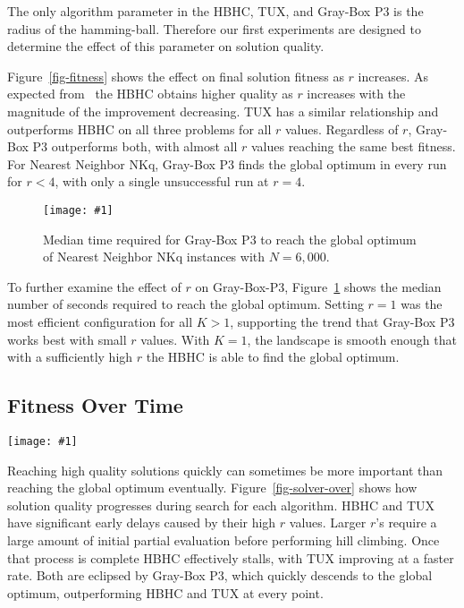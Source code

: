 \documentclass{sig-alternate}
\newcommand{\includegraphicsfit}[1]
{\texttt{[image: \#1]}}
\newcommand{\includegraphicswide}[1]
{\texttt{[image: \#1]}}
\begin{document}
The only algorithm parameter in the HBHC, TUX, and Gray-Box P3
is the radius of the hamming-ball. Therefore our first experiments are designed to determine
the effect of this parameter on solution quality.

Figure~\ref{fig-fitness} shows the effect on final solution fitness as $r$ increases. As expected
from~\cite{chicano:2014:ball} the HBHC obtains higher quality as $r$ increases with the magnitude
of the improvement decreasing. TUX has a similar relationship and
outperforms HBHC on all three problems for all $r$ values. Regardless of $r$, Gray-Box P3 outperforms both, with almost
all $r$ values reaching the same best fitness. For Nearest Neighbor NKq, Gray-Box P3 finds the global
optimum in every run for $r < 4$, with only a single unsuccessful run at $r=4$.

\begin{figure}
  \centering
  \includegraphicsfit{p3-seconds}
  \caption{Median time required for Gray-Box P3 to reach the global optimum of Nearest Neighbor NKq instances with $N=6,000$.}
  \label{fig-p3-seconds}
\end{figure}

To further examine the effect of $r$ on Gray-Box-P3, Figure~\ref{fig-p3-seconds} shows the median number of
seconds required to reach the global optimum. Setting $r=1$ was the most efficient configuration for all $K > 1$,
supporting the trend that Gray-Box P3 works best with small $r$ values. With $K=1$, the landscape is smooth enough
that with a sufficiently high $r$ the HBHC is able to find the global optimum.

\subsection{Fitness Over Time}

\begin{figure*}
  \centering
  \includegraphicswide{solver-over}
  \caption{Comparison of solution quality during optimization on a log-log scale for different algorithms. For NKq-Landscapes $N=6,000$ and $K=4$ and
  for Ising Spin Glasses $N=6,084$. Each algorithm uses its best found $r$ value.}
  \label{fig-solver-over}
\end{figure*}

Reaching high quality solutions quickly can sometimes be more important than reaching the global optimum
eventually. Figure~\ref{fig-solver-over} shows how solution quality progresses during
search for each algorithm. HBHC and TUX have significant early delays caused by their high $r$ values. Larger
$r$'s require a large amount of initial partial evaluation before performing hill climbing. Once that process
is complete HBHC effectively stalls, with TUX improving at a faster rate. Both are eclipsed by Gray-Box P3,
which quickly descends to the global optimum, outperforming HBHC and TUX at every point.
\end{document}
